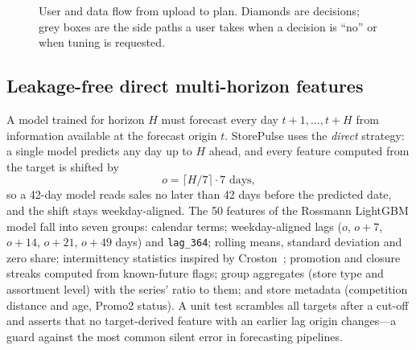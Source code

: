 \documentclass[conference]{IEEEtran}
\newcommand{\code}[1]{\texttt{\small #1}}
\begin{document}
\begin{figure}[t]
\caption{User and data flow from upload to plan. Diamonds are decisions; grey boxes are the side
paths a user takes when a decision is ``no'' or when tuning is requested.}
\label{fig:flow}
\end{figure}

\subsection{Leakage-free direct multi-horizon features}\label{sec:features}
A model trained for horizon $H$ must forecast every day $t+1,\ldots,t+H$ from information available
at the forecast origin $t$. StorePulse uses the \emph{direct} strategy: a single model predicts any
day up to $H$ ahead, and every feature computed from the target is shifted by
\begin{equation}
  \textstyle o = \lceil H/7 \rceil \cdot 7 \text{ days},
\end{equation}
so a 42-day model reads sales no later than 42 days before the predicted date, and the shift stays
weekday-aligned. The 50 features of the Rossmann LightGBM model fall into seven groups:
calendar terms; weekday-aligned lags ($o$, $o{+}7$, $o{+}14$, $o{+}21$, $o{+}49$ days) and
\code{lag\_364}; rolling means, standard deviation and zero share; intermittency statistics
inspired by Croston~\cite{croston1972intermittent}; promotion and closure streaks computed from
known-future flags; group aggregates (store type and assortment level) with the series' ratio to
them; and store metadata (competition distance and age, Promo2 status). A unit test scrambles all
targets after a cut-off and asserts that no target-derived feature with an earlier lag origin
changes---a guard against the most common silent error in forecasting pipelines.
\end{document}

